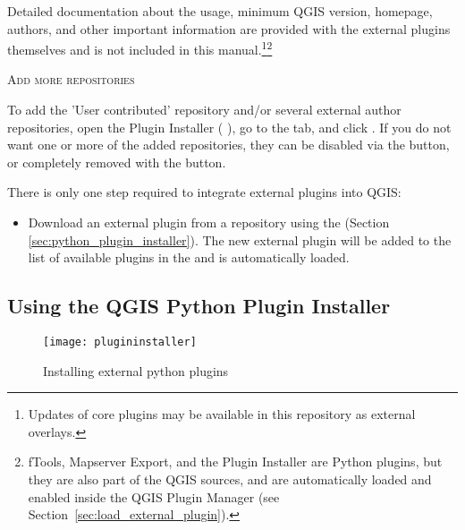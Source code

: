 Detailed documentation about the usage, minimum QGIS version, homepage, authors,
and other important information are provided with the external plugins themselves
and is not included in this manual.\footnote{Updates of core plugins may be
available in this repository as external overlays.}\footnote{fTools, Mapserver 
Export, and the Plugin Installer are Python plugins, but they are also part of 
the QGIS sources, and are automatically loaded and enabled inside the QGIS 
Plugin Manager (see Section~\ref{sec:load_external_plugin}).}

\begin{Tip} \caption{\textsc{Add more repositories}}
To add the 'User contributed' repository and/or several external author repositories, open the
Plugin Installer ( \arrow {}),
go to the  tab, and click .
If you do not want one or more of the added repositories, they can be disabled via the
 button, or completely removed with the  button.
\end{Tip}

There is only one step required to integrate external plugins into QGIS:

\begin{itemize}[label=--]
\item Download an external plugin from a repository using the
 (Section \ref{sec:python_plugin_installer}).
The new external plugin will be added to the list of available plugins in
the  and is automatically loaded.
\end{itemize}

\subsection{Using the QGIS Python Plugin Installer}\label{sec:python_plugin_installer}

\begin{figure}[ht]
   \centering
   \texttt{[image: plugininstaller]}
   \caption{Installing external python plugins \nixcaption}\label{fig:plugininstaller}\smallskip
\end{figure}

